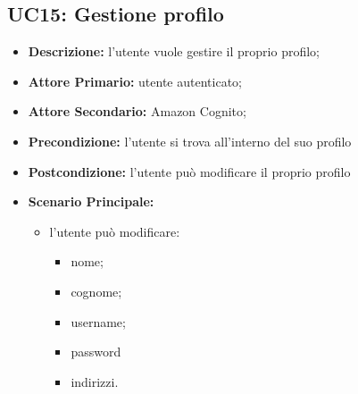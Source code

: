 \subsection{UC15: Gestione profilo}
\label{sec:UC15}
\begin{itemize}
    \item \textbf{Descrizione:} l'utente vuole gestire il proprio profilo;
    \item \textbf{Attore Primario:} utente autenticato;
    \item \textbf{Attore Secondario:} Amazon Cognito;
    \item \textbf{Precondizione:} l'utente si trova all'interno del suo profilo
    \item \textbf{Postcondizione:} l'utente può modificare il proprio profilo
    \item \textbf{Scenario Principale:}
    \begin{itemize}
        \item  l'utente può modificare:
        \begin{itemize}
            \item nome;
            \item cognome;
            \item username;
            \item password
            \item indirizzi.
        \end{itemize}
    \end{itemize}
\end{itemize}
